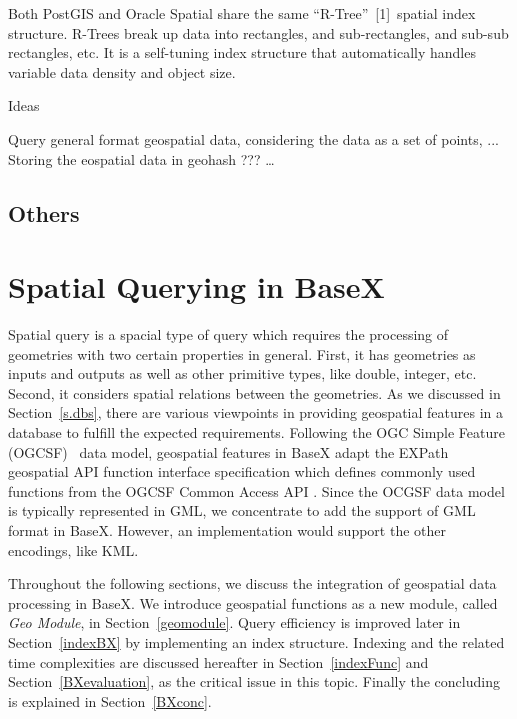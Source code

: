 \documentclass[a4paper,12pt]{article}
\begin{document}
Both PostGIS and Oracle Spatial share the same “R-Tree” [1] spatial index structure. R-Trees break up data into rectangles, and sub-rectangles, and sub-sub rectangles, etc. It is a self-tuning index structure that automatically handles variable data density and object size.

Ideas

Query general format geospatial data, considering the data as a set of points, ...
Storing the eospatial data in geohash ???
…


\subsection{Others}
\newpage

















\section{Spatial Querying in BaseX}
\label{s.basex}
Spatial query is a spacial type of query which requires the processing of geometries with two certain properties in general. First, it has geometries as inputs and outputs as well as other primitive types, like double, integer, etc. Second, it considers spatial relations between the geometries.
As we discussed in Section~\ref{s.dbs}, there are various viewpoints in providing geospatial features in a database to fulfill the expected requirements. Following the OGC Simple Feature (OGCSF)~\cite{springergeo} data model, geospatial features in BaseX adapt the EXPath geospatial API function interface specification which defines commonly used functions from the OGCSF Common Access API \cite{simpleFeature}. Since the OCGSF data model is typically represented in GML, we concentrate to add the support of GML format in BaseX. However, an implementation would support the other encodings, like KML. 

Throughout the following sections, we discuss the integration of geospatial data processing in BaseX. We introduce geospatial functions as a new module, called \textit{Geo Module}, in Section~\ref{geomodule}. Query efficiency is improved later in Section~\ref{indexBX} by implementing an index structure. Indexing and the related time complexities are discussed hereafter in Section~\ref{indexFunc} and Section~\ref{BXevaluation}, as the critical issue in this topic. Finally the concluding is explained in Section~\ref{BXconc}.
\end{document}
